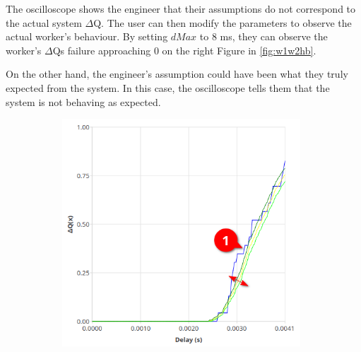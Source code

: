     The oscilloscope shows the engineer that their assumptions do not correspond to the actual system $\Delta$Q. The user can then modify the parameters to observe the actual worker's behaviour. By setting $dMax$ to 8 ms, they can observe the worker's $\Delta$Qs failure approaching $0$ on the right Figure in \cref{fig:w1w2hb}.

    On the other hand, the engineer's assumption could have been what they truly expected from the system. In this case, the oscilloscope tells them that the system is not behaving as expected. 

\begin{figure}[H]
            \centering
            \begin{subfigure}{.5\textwidth}
                \centering
                \includegraphics[width=0.98\textwidth]{img/overload_2/worker_1a.png}
                \label{fig:w14}
            \end{subfigure}%
            \begin{subfigure}{.5\textwidth}
                \centering

\end{subfigure}
\end{figure}
